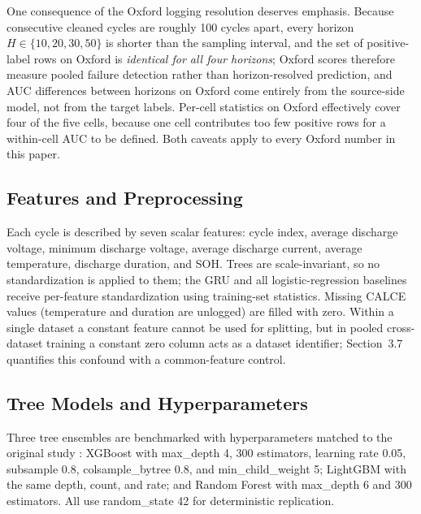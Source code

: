 \documentclass[IJPHM, 2014, 00]{PHMSociety}
\begin{document}
One consequence of the Oxford logging resolution deserves emphasis. Because consecutive cleaned cycles are roughly 100 cycles apart, every horizon $H\in\{10,20,30,50\}$ is shorter than the sampling interval, and the set of positive-label rows on Oxford is \emph{identical for all four horizons}; Oxford scores therefore measure pooled failure detection rather than horizon-resolved prediction, and AUC differences between horizons on Oxford come entirely from the source-side model, not from the target labels. Per-cell statistics on Oxford effectively cover four of the five cells, because one cell contributes too few positive rows for a within-cell AUC to be defined. Both caveats apply to every Oxford number in this paper.

\subsection{Features and Preprocessing}
Each cycle is described by seven scalar features: cycle index, average discharge voltage, minimum discharge voltage, average discharge current, average temperature, discharge duration, and SOH. Trees are scale-invariant, so no standardization is applied to them; the GRU and all logistic-regression baselines receive per-feature standardization using training-set statistics. Missing CALCE values (temperature and duration are unlogged) are filled with zero. Within a single dataset a constant feature cannot be used for splitting, but in pooled cross-dataset training a constant zero column acts as a dataset identifier; Section~3.7 quantifies this confound with a common-feature control.

\subsection{Tree Models and Hyperparameters}
Three tree ensembles are benchmarked with hyperparameters matched to the original study \cite{shikdar2026learning}: XGBoost \cite{chen2016xgboost} with max\_depth 4, 300 estimators, learning rate 0.05, subsample 0.8, colsample\_bytree 0.8, and min\_child\_weight 5; LightGBM \cite{ke2017lightgbm} with the same depth, count, and rate; and Random Forest \cite{breiman2001random} with max\_depth 6 and 300 estimators. All use random\_state 42 for deterministic replication.
\end{document}

